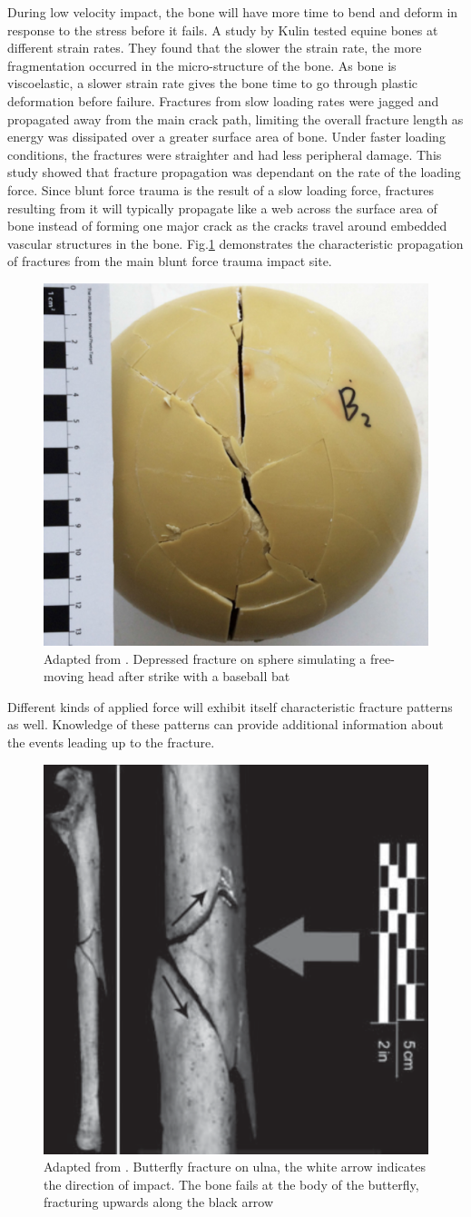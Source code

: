 \documentclass[titlepage]{article}
\begin{document}
During low velocity impact, the bone will have more time to bend and deform in response to the stress before it fails. A study by Kulin\cite{post-imaging} tested equine bones at different strain rates. They found that the slower the strain rate, the more fragmentation occurred in the micro-structure of the bone. As bone is viscoelastic, a slower strain rate gives the bone time to go through plastic deformation before failure. Fractures from slow loading rates were jagged and propagated away from the main crack path, limiting the overall fracture length as energy was dissipated over a greater surface area of bone. Under faster loading conditions, the fractures were straighter and had less peripheral damage. This study showed that fracture propagation was dependant on the rate of the loading force. Since blunt force trauma is the result of a slow loading force, fractures resulting from it will typically propagate like a web across the surface area of bone instead of forming one major crack as the cracks travel around embedded vascular structures in the bone. Fig.\ref{fig:skull} demonstrates the characteristic propagation of fractures from the main blunt force trauma impact site.

\begin{figure}[h!]
\centering
\includegraphics[width=.4\linewidth]{blunt_trauma}
\caption{Adapted from \cite{craniums}. Depressed fracture on sphere simulating a free-moving head after strike with a baseball bat}
\label{fig:skull}
\end{figure}

Different kinds of applied force will exhibit itself characteristic fracture patterns as well. Knowledge of these patterns can provide additional information about the events leading up to the fracture.

\begin{figure}[h!]
\centering
\includegraphics[width=.4\linewidth]{butterfly}
\caption{Adapted from \cite{bft}. Butterfly fracture on ulna, the white arrow indicates the direction of impact. The bone fails at the body of the butterfly, fracturing upwards along the black arrow}
\label{fig:butterfly-fracture}
\end{figure}
\end{document}
